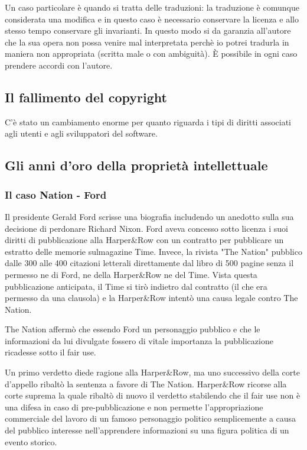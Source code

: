 Un caso particolare è quando si tratta delle traduzioni: la traduzione è comunque considerata una modifica e in questo caso è necessario conservare la licenza e allo stesso tempo conservare gli invarianti. In questo modo si da garanzia all'autore che la sua opera non possa venire mal interpretata perchè io potrei tradurla in maniera non appropriata (scritta male o con ambiguità). È possibile in ogni caso prendere accordi con l'autore.

\subsection{Il fallimento del copyright}

C'è stato un cambiamento enorme per quanto riguarda i tipi di diritti associati agli utenti e agli sviluppatori del software. 

\subsection{Gli anni d'oro della proprietà intellettuale}
\subsubsection{Il caso Nation - Ford}

Il presidente Gerald Ford scrisse una biografia includendo un anedotto sulla sua decisione di perdonare Richard Nixon. 
Ford aveva concesso sotto licenza i suoi diritti di pubblicazione alla Harper\&Row con un contratto per pubblicare un estratto delle memorie sulmagazine Time. Invece, la rivista "The Nation" pubblico dalle 300 alle 400 citazioni letterali direttamente dal libro di 500 pagine senza il permesso ne di Ford, ne della Harper\&Row ne del Time.
Vista questa pubblicazione anticipata, il Time si tirò indietro dal contratto (il che era permesso da una clausola) e la Harper\&Row intentò una causa legale contro The Nation.

The Nation affermò che essendo Ford un personaggio pubblico e che le informazioni da lui divulgate fossero di vitale importanza la pubblicazione ricadesse sotto il fair use.

Un primo verdetto diede ragione alla Harper\&Row, ma uno successivo
della corte d'appello ribaltò la sentenza a favore di The Nation. Harper\&Row ricorse alla corte suprema la quale ribaltò di nuovo il
verdetto stabilendo che il fair use non è una difesa in caso di  
pre-pubblicazione e non permette l'appropriazione commerciale del 
lavoro di un famoso personaggio politico semplicemente 
a causa del pubblico interesse nell'apprendere informazioni su una
figura politica di un evento storico.

